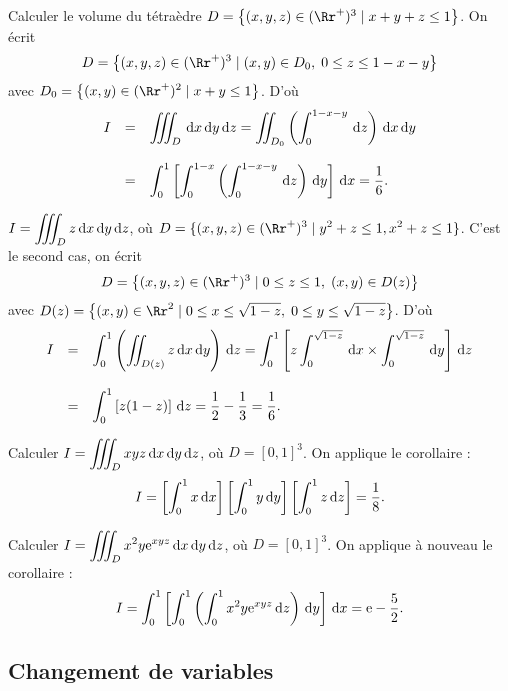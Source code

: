 \documentclass[class=report,crop=false]{standalone}
\begin{document}
\vskip6mm

Calculer le volume du tétraèdre $D=\left\{(x,y,z)\in (\Rr^+)^3\mid x+y+z\leq 1\right\}$. On écrit 
$$D=\left\{(x,y,z)\in (\Rr^+)^3\mid (x,y)\in D_0,\; 0\leq z\leq 1-x-y\right\}$$
avec $\displaystyle D_0=\left\{(x,y)\in (\Rr^+)^2\mid x+y\leq 1\right\}$. D'o\`u
$$\begin{array}{ccl}I&=&\displaystyle\int \!\!\!\!\int \!\!\!\!\int_{D}\d x\d y\d z=\int \!\!\!\!\int_{D_0}\left(\int _{0}^{1-x-y}\d z\right)\d x\d y\\ \\ &=&\displaystyle \int _{0}^{1}\left[\int _{0}^{1-x}\left(\int _{0}^{1-x-y}\d z\right)\d y\right]\d x=\frac{1}{6}.\end{array}$$

\vskip6mm

$\displaystyle I=\int \!\!\!\!\int \!\!\!\!\int_{D}z\d x\d y\d z$, o\`u $\displaystyle D=\{ (x,y,z)\in (\Rr^{+})^3\mid y^{2}+z\leq 1,x^{2}+z\leq 1\} $. 
C'est le second cas, on écrit
$$D=\left\{(x,y,z)\in (\Rr^+)^3\mid 0\leq z\leq 1,\; (x,y)\in D(z)\right\}$$
avec $\displaystyle D(z)=\left\{(x,y)\in \Rr^2\mid 0\leq x\leq \sqrt{1-z},\; 0\leq y\leq \sqrt{1-z}\right\}$. D'o\`u
$$\begin{array}{ccl}I&=&\displaystyle \int _{0}^{1}\left(\int \!\!\!\!\int_{D(z)}z\,\mathrm{d} x\,\mathrm{d} y\right)\,\mathrm{d} z=\int _{0}^{1}\left[z\int _0^{\sqrt{1-z}}\,\mathrm{d} x\times \int _0^{\sqrt{1-z}}\,\mathrm{d} y\right]\,\mathrm{d} z\\ \\ &=&\displaystyle \int _{0}^{1}\left[z(1-z)\right]\,\mathrm{d} z=\frac{1}{2}-\frac{1}{3}=\frac{1}{6}.\end{array}$$

\vskip6mm

Calculer $\displaystyle I=\int \!\!\!\!\int \!\!\!\!\int_{D}xyz\d x\d y\d z$, o\`u $D=[0,1]^3$. On applique le corollaire :
$$I=\left[\int _{0}^{1}x\,\mathrm{d} x\right]\left[\int _{0}^{1}y\,\mathrm{d} y\right]\left[\int _{0}^{1}z\,\mathrm{d} z\right]=\frac{1}{8}.$$

\vskip6mm

Calculer $\displaystyle I=\int \!\!\!\!\int \!\!\!\!\int_{D}x^2y\e^{xyz}\d x\d y\d z$, o\`u $D=[0,1]^3$. On applique à nouveau le corollaire :
$$I=\int _{0}^{1}\left[\int _{0}^{1}\left(\int _{0}^{1}x^2y{\rm e}^{xyz}\,\mathrm{d} z\right)\,\mathrm{d} y\right]\,\mathrm{d} x={\rm e}-\frac{5}{2}.$$

\vskip8mm

\subsection{Changement de variables}
\end{document}

